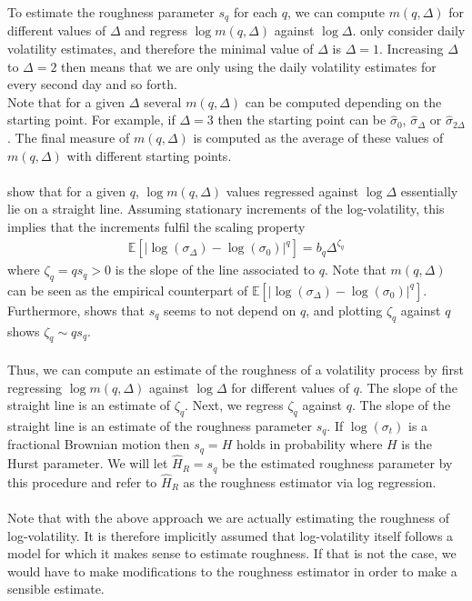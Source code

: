 \documentclass{article}
\begin{document}
To estimate the roughness parameter $s_q$ for each $q$, we can compute $m(q,\Delta)$ for different values of $\Delta$ and regress $\log m(q,\Delta)$ against $\log \Delta$. \cite{gatheral} only consider daily volatility estimates, and therefore the minimal value of $\Delta$ is $\Delta=1$. Increasing $\Delta$ to $\Delta=2$ then means that we are only using the daily volatility estimates for every second day and so forth.\\
Note that for a given $\Delta$ several $m(q,\Delta)$ can be computed depending on the starting point. For example, if $\Delta=3$ then the starting point can be $\hat{\sigma}_0$, $\hat{\sigma}_{\Delta}$ or $\hat{\sigma}_{2\Delta}$. The final measure of $m(q,\Delta)$ is computed as the average of these values of $m(q,\Delta)$ with different starting points.\\\\
\cite{gatheral} show that for a given $q$, $\log m(q,\Delta)$ values regressed against $\log \Delta$ essentially lie on a straight line. Assuming stationary increments of the log-volatility, this implies that the increments fulfil the scaling property 
\begin{align*}
\mathbb{E}\left[ \lvert \log (\sigma_\Delta) - \log (\sigma_0) \rvert^q\right] = b_q\Delta^{\zeta _q}
\end{align*}
where $\zeta_q = qs_q>0$ is the slope of the line associated to $q$. Note that $m(q,\Delta)$ can be seen as the empirical counterpart of $\mathbb{E}\left[ \lvert \log (\sigma_\Delta) - \log (\sigma_0) \rvert^q\right]$. Furthermore, \cite{gatheral} shows that $s_q$ seems to not depend on $q$, and plotting $\zeta_q$ against $q$ shows $\zeta_q \sim qs_q$.\\\\
Thus, we can compute an estimate of the roughness of a volatility process by first regressing $\log m(q,\Delta)$ against $\log \Delta$ for different values of $q$. The slope of the straight line is an estimate of $\zeta_q$. Next, we regress $\zeta_q$ against $q$. The slope of the straight line is an estimate of the roughness parameter $s_q$. If $\log(\sigma_t)$ is a fractional Brownian motion then $s_q=H$ holds in probability where $H$ is the Hurst parameter. We will let $\widehat{H}_R = s_q$ be the estimated roughness parameter by this procedure and refer to $\widehat{H}_R$ as the roughness estimator via log regression.\\\\
Note that with the above approach we are actually estimating the roughness of log-volatility. It is therefore implicitly assumed that log-volatility itself follows a model for which it makes sense to estimate roughness. If that is not the case, we would have to make modifications to the roughness estimator in order to make a sensible estimate. \\
\end{document}
